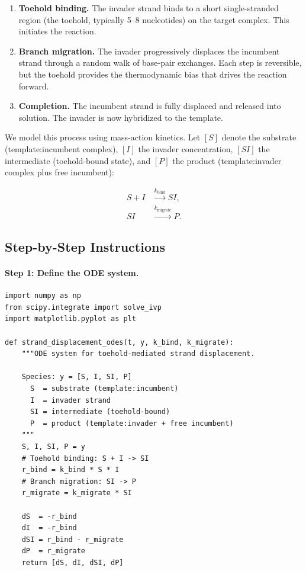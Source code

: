 \begin{enumerate}[leftmargin=1.8em]
  \item \textbf{Toehold binding.} The invader strand binds to a short single-stranded region (the toehold, typically 5--8 nucleotides) on the target complex. This initiates the reaction.
  \item \textbf{Branch migration.} The invader progressively displaces the incumbent strand through a random walk of base-pair exchanges. Each step is reversible, but the toehold provides the thermodynamic bias that drives the reaction forward.
  \item \textbf{Completion.} The incumbent strand is fully displaced and released into solution. The invader is now hybridized to the template.
\end{enumerate}

We model this process using mass-action kinetics. Let $[S]$ denote the substrate (template:incumbent complex), $[I]$ the invader concentration, $[SI]$ the intermediate (toehold-bound state), and $[P]$ the product (template:invader complex plus free incumbent):

\begin{align}
S + I &\xrightarrow{k_{\text{bind}}} SI, \label{eq:sd-bind} \\
SI &\xrightarrow{k_{\text{migrate}}} P. \label{eq:sd-migrate}
\end{align}

\subsection{Step-by-Step Instructions}

\paragraph{Step 1: Define the ODE system.}

\begin{lstlisting}[style=dogmapython, caption={Lab 2: Strand displacement ODE system.}]
import numpy as np
from scipy.integrate import solve_ivp
import matplotlib.pyplot as plt

def strand_displacement_odes(t, y, k_bind, k_migrate):
    """ODE system for toehold-mediated strand displacement.

    Species: y = [S, I, SI, P]
      S  = substrate (template:incumbent)
      I  = invader strand
      SI = intermediate (toehold-bound)
      P  = product (template:invader + free incumbent)
    """
    S, I, SI, P = y
    # Toehold binding: S + I -> SI
    r_bind = k_bind * S * I
    # Branch migration: SI -> P
    r_migrate = k_migrate * SI

    dS  = -r_bind
    dI  = -r_bind
    dSI = r_bind - r_migrate
    dP  = r_migrate
    return [dS, dI, dSI, dP]
\end{lstlisting}

